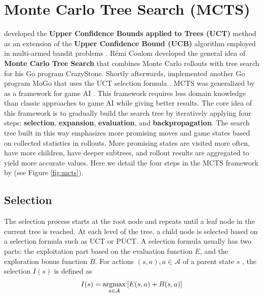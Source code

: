 \section{Monte Carlo Tree Search (MCTS)} \label{sec:mcts}

\citeauthor{BanditBasedMonteCarlo_Kocsis.Szepesvari_2006} developed the \textbf{Upper Confidence Bounds applied to Trees (UCT)} method as an extension of the \textbf{Upper Confidence Bound (UCB)} algorithm employed in multi-armed bandit problems \cite{BanditBasedMonteCarlo_Kocsis.Szepesvari_2006}.
Rémi Coulom developed the general idea of \textbf{Monte Carlo Tree Search} that combines Monte Carlo rollouts with tree search \cite{EfficientSelectivityBackup_Coulom_2007} for his Go program CrazyStone.
Shortly afterwards,
\citeauthor{ModificationUCTPatterns_Gelly.Wang.ea_2006} implemented another Go program MoGo that uses the UCT selection formula \cite{ModificationUCTPatterns_Gelly.Wang.ea_2006}.
MCTS was generalized by \citeauthor{MonteCarloTreeSearch_Chaslot.Bakkes.ea_2008} as a framework for game AI \cite{MonteCarloTreeSearch_Chaslot.Bakkes.ea_2008}.
This framework requires less domain knowledge than classic approaches to game AI while giving better results.
The core idea of this framework is to gradually build the search tree by iteratively applying four steps: \textbf{selection}, \textbf{expansion}, \textbf{evaluation}, and \textbf{backpropagation}.
The search tree built in this way emphasizes more promising moves and game states based on collected statistics in rollouts.
More promising states are visited more often, have more children, have deeper subtrees, and rollout results are aggregated to yield more accurate values. Here we detail the four steps in the MCTS framework by \citeauthor{MonteCarloTreeSearch_Chaslot.Bakkes.ea_2008} (see Figure \ref{fig:mcts}).


\subsection{Selection}
The selection process starts at the root node and repeats until a leaf node in the current tree is reached.
At each level of the tree, a child node is selected based on a selection formula such as UCT or PUCT.
A selection formula usually has two parts: the exploitation part based on the evaluation function $E$, and the exploration bonus function $B$.
For actions $(s, a), a \in \mathcal{A}$ of a parent state $s$ , the selection $I(s)$ is defined as
\begin{align*}
    I(s) = \operatorname*{argmax}_{a \in \mathcal{A}}{\left[ E(s, a) + B(s, a) \right]}
    \label{eq:mcts_selection}
\end{align*}

